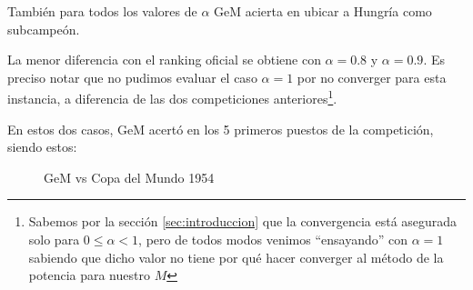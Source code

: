 \begin{enumerate}[parsep=1ex]
        \par También para todos los valores de $\alpha$ GeM acierta en ubicar a
        Hungría como subcampeón.

        \par La menor diferencia con el ranking oficial se obtiene con
        $\alpha=0.8$ y $\alpha=0.9$. Es preciso notar que no pudimos evaluar el
        caso $\alpha=1$ por no converger para esta instancia, a diferencia de
        las dos competiciones anteriores\footnote{Sabemos por la secci\'on
        \ref{sec:introduccion} que la convergencia está asegurada solo para $0\leq\alpha <1$, pero de todos modos venimos
        ``ensayando'' con $\alpha=1$ sabiendo que dicho valor no tiene por qué hacer
        converger al m\'etodo de la potencia para nuestro $M$}.

        \par En estos dos casos, GeM acertó en los 5 primeros puestos de la
        competición, siendo estos:

        \begin{figure}[H]
            \centering
            \hspace{10pt}
            \caption{GeM vs Copa del Mundo 1954}
        \end{figure}
\end{enumerate}
\medskip

